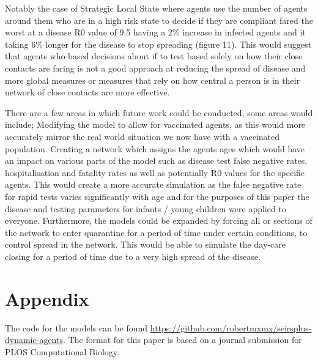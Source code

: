 \documentclass{article}
\begin{document}
Notably the case of Strategic Local State where agents use the number of agents around them who are in a high risk state to decide if they are compliant fared the worst at a disease R0 value of 9.5 having a 2\% increase in infected agents and it taking 6\% longer for the disease to stop spreading (figure 11). This would suggest that agents who based decisions about if to test based solely on how their close contacts are faring is not a good approach at reducing the spread of disease and more global measures or measures that rely on how central a person is in their network of close contacts are more effective. \newline 

There are a few areas in which future work could be conducted, some areas would include; Modifying the model to allow for vaccinated agents, as this would more accurately mirror the real world situation we now have with a vaccinated population. Creating a network which assigns the agents ages which would have an impact on various parts of the model such as disease test false negative rates, hospitalisation and fatality rates as well as potentially R0 values for the specific agents. This would create a more accurate simulation as the false negative rate for rapid tests varies significantly with age and for the purposes of this paper the disease and testing parameters for infants / young children were applied to everyone. Furthermore, the models could be expanded by forcing all or sections of the network to enter quarantine for a period of time under certain conditions, to control spread in the network. This would be able to simulate the day-care closing for a period of time due to a very high spread of the disease.


\newpage
\appendix

\section{Appendix}
The code for the models can be found \url{https://github.com/robertmxmx/seirsplus-dynamic-agents}.
The format for this paper is based on a journal submission for PLOS Computational Biology.


{}

\end{document}
